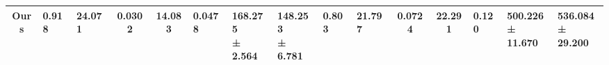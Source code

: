 \documentclass[10pt,twocolumn,letterpaper]{article}
\begin{document}
\begin{table*}[!htbp]
{\begin{tabularx}{\textwidth}{ll*{2}{p{0.5cm}}ccp{0.5cm}l@{}l|*{2}{p{0.5cm}}ccp{0.5cm}l@{}l}
\midrule

\multicolumn{2}{c}{\footnotesize{Ours}} & \scriptsize{\textbf{0.918}} & \textbf{\scriptsize{24.071}} & \textbf{\scriptsize{0.0302}} & \textbf{\scriptsize{14.083}} & \textbf{\scriptsize{0.0478}} & \makecell{\textbf{\scriptsize{168.275}} \\ \textbf{\scriptsize{± 2.564}}} & \makecell{\textbf{\scriptsize{148.253}} \\ \textbf{\scriptsize{± 6.781}}} & \textbf{\scriptsize{0.803}} & \textbf{\scriptsize{21.797}} & \textbf{\scriptsize{0.0724}} & \scriptsize{22.291} & \textbf{\scriptsize{0.120}} & \makecell{\textbf{\scriptsize{500.226}} \\ \textbf{\scriptsize{± 11.670}}} & \makecell{\textbf{\scriptsize{536.084}} \\ \textbf{\scriptsize{± 29.200}}} \\

\bottomrule

\end{tabularx}}
\end{table*}
\end{document}
